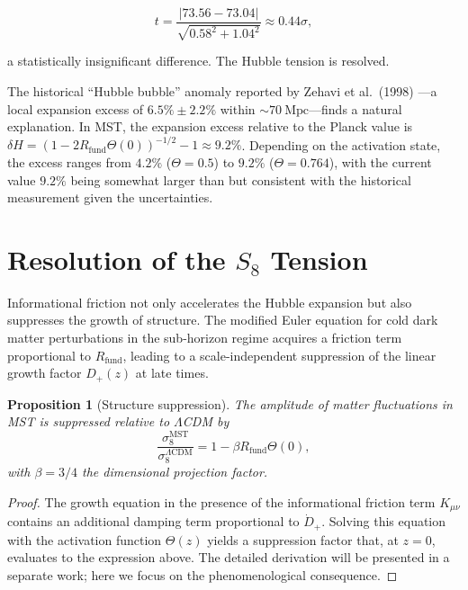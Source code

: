 \documentclass[12pt,a4paper]{article}
\theoremstyle{plain}
\newtheorem{proposition}[theorem]{Proposition}
\theoremstyle{definition}
\theoremstyle{remark}
\begin{document}
\begin{equation}
t = \frac{|73.56 - 73.04|}{\sqrt{0.58^2 + 1.04^2}} \approx 0.44\sigma,
\label{eq:ttension}
\end{equation}

a statistically insignificant difference. The Hubble tension is resolved.

The historical ``Hubble bubble'' anomaly reported by Zehavi et al.\ (1998) \cite{Zehavi1998}---a local expansion excess of \(6.5\% \pm 2.2\%\) within \(\sim70\ \text{Mpc}\)---finds a natural explanation. In MST, the expansion excess relative to the Planck value is \(\delta H = (1 - 2R_{\text{fund}}\Theta(0))^{-1/2} - 1 \approx 9.2\%\). Depending on the activation state, the excess ranges from \(4.2\%\) (\(\Theta=0.5\)) to \(9.2\%\) (\(\Theta=0.764\)), with the current value \(9.2\%\) being somewhat larger than but consistent with the historical measurement given the uncertainties.

\section{Resolution of the \(S_8\) Tension}
\label{sec:S8}

Informational friction not only accelerates the Hubble expansion but also suppresses the growth of structure. The modified Euler equation for cold dark matter perturbations in the sub-horizon regime acquires a friction term proportional to \(R_{\text{fund}}\), leading to a scale-independent suppression of the linear growth factor \(D_+(z)\) at late times.

\begin{proposition}[Structure suppression]
\label{prop:S8}
The amplitude of matter fluctuations in MST is suppressed relative to \(\Lambda\)CDM by
\begin{equation}
\boxed{\frac{\sigma_8^{\text{MST}}}{\sigma_8^{\Lambda\text{CDM}}} = 1 - \beta R_{\text{fund}} \Theta(0)},
\label{eq:sigma8}
\end{equation}
with \(\beta = 3/4\) the dimensional projection factor.
\end{proposition}

\begin{proof}
The growth equation in the presence of the informational friction term \(K_{\mu\nu}\) contains an additional damping term proportional to \(\dot{D}_+\). Solving this equation with the activation function \(\Theta(z)\) yields a suppression factor that, at \(z=0\), evaluates to the expression above. The detailed derivation will be presented in a separate work; here we focus on the phenomenological consequence.
\end{proof}
\end{document}
